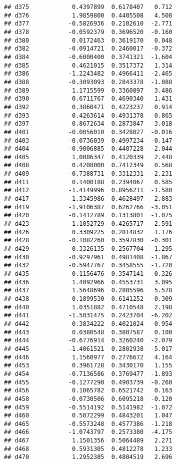 \documentclass[
]{article}
\begin{document}
\begin{verbatim}
## d375            0.4397899  0.6178407   0.712
## d376            1.9859800  0.4405508   4.508
## d377           -0.5826936  0.2102610  -2.771
## d378           -0.0592379  0.3696520  -0.160
## d380            0.0172463  0.3619170   0.048
## d382           -0.0914721  0.2460017  -0.372
## d384           -0.6000400  0.3741321  -1.604
## d385            0.4621015  0.3517372   1.314
## d386           -1.2243482  0.4966411  -2.465
## d388           -0.3093093  0.2843378  -1.088
## d389            1.1715599  0.3360897   3.486
## d390            0.6711767  0.4690340   1.431
## d392            0.3860471  0.4223237   0.914
## d393            0.4263614  0.4931378   0.865
## d397            0.8672634  0.2873847   3.018
## d401           -0.0056010  0.3428027  -0.016
## d403           -0.0736039  0.4997234  -0.147
## d404           -0.9006885  0.4407228  -2.044
## d405            1.0086347  0.4120339   2.448
## d408            0.4208000  0.7412349   0.568
## d409           -0.7388731  0.3312331  -2.231
## d411            0.1400188  0.2394067   0.585
## d412           -1.4149996  0.8956211  -1.580
## d417            1.3345986  0.4628497   2.883
## d419           -1.9106387  0.6262766  -3.051
## d420           -0.1412789  0.1313801  -1.075
## d423            1.1052729  0.4265717   2.591
## d426            0.3309225  0.2814832   1.176
## d428           -0.1082260  0.3597830  -0.301
## d429           -0.3326135  0.2567704  -1.295
## d430           -0.9297961  0.4981408  -1.867
## d432           -0.5947767  0.3458555  -1.720
## d435            0.1156476  0.3547141   0.326
## d436            1.4092966  0.4553731   3.095
## d437            1.5648696  0.2805596   5.578
## d438            0.1899530  0.6141252   0.309
## d440            1.0351882  0.4710548   2.198
## d441           -1.5031475  0.2423704  -6.202
## d442            0.3834222  0.4021024   0.954
## d443            0.0380548  0.3807587   0.100
## d444           -0.6776914  0.3260240  -2.079
## d445           -1.4061521  0.2802938  -5.017
## d446            1.1560977  0.2776672   4.164
## d453            0.3961728  0.3430170   1.155
## d454           -0.7136586  0.3769477  -1.893
## d455           -0.1277290  0.4903739  -0.260
## d456            0.1065782  0.6521742   0.163
## d458           -0.0730506  0.6095218  -0.120
## d459           -0.5514192  0.5141982  -1.072
## d460            0.5072299  0.4843201   1.047
## d465           -0.5573248  0.4577386  -1.218
## d466           -1.0743797  0.2573380  -4.175
## d467            1.1501356  0.5064489   2.271
## d468            0.5931305  0.4812278   1.233
## d470            1.2952385  0.4804519   2.696

\end{verbatim}
\end{document}
